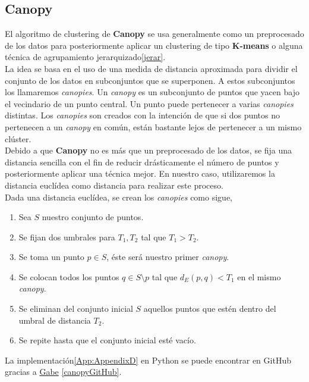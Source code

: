 \documentclass[a4paper, 12pt]{article}
\begin{document}
\pagebreak
\subsection{Canopy}

El algoritmo de clustering de \textbf{Canopy} se usa generalmente como un preprocesado de los datos para posteriormente aplicar un clustering de tipo \textbf{K-means} o alguna t\'ecnica de agrupamiento jerarquizado\ref{jerar}.\\

La idea se basa en el uso de una medida de distancia aproximada para dividir el conjunto de los datos en subconjuntos que se superponen. A estos subconjuntos los llamaremos \textit{canopies}. Un \textit{canopy} es un subconjunto de puntos que yacen bajo el vecindario de un punto central. Un punto puede pertenecer a varias \textit{canopies} distintas. Los \textit{canopies} son creados con la intenci\'on de que si dos puntos no pertenecen a un \textit{canopy} en com\'un, est\'an bastante lejos de pertenecer a un mismo cl\'uster. \\

Debido a que \textbf{Canopy} no es m\'as que un preprocesado de los datos, se fija una distancia sencilla con el fin de reducir dr\'asticamente el n\'umero de puntos y posteriormente aplicar una t\'ecnica mejor. En nuestro caso, utilizaremos la distancia eucl\'idea como distancia para realizar este proceso. \\

Dada una distancia eucl\'idea, se crean los \textit{canopies} como sigue,

\begin{enumerate}
	\item Sea $S$ nuestro conjunto de puntos.
	\item Se fijan dos umbrales para $T_1, T_2$ tal que $T_1 > T_2$. 
	\item Se toma un punto $p\in S$, \'este ser\'a nuestro primer \textit{canopy}.
	\item Se colocan todos los puntos $q\in S\setminus{p}$ tal que $d_E(p, q) < T_1$ en el mismo \textit{canopy}. 
	\item Se eliminan del conjunto inicial $S$ aquellos puntos que est\'en dentro del umbral de distancia $T_2$.
	\item Se repite hasta que el conjunto inicial est\'e vac\'io.
\end{enumerate}

La implementaci\'on\ref{App:AppendixD} en Python se puede encontrar en GitHub gracias a \href{https://github.com/gdbassett}{Gabe} \ref{canopyGitHub}.
\end{document}
